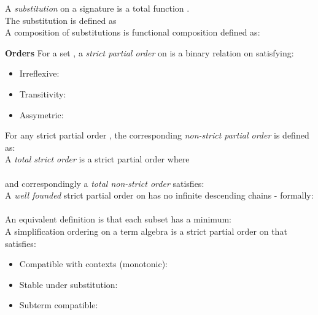 A \emph{substitution} on a signature  is a total function .\\
The substitution \m{[x \mapsto t]} is defined as \\
A composition of substitutions  is functional composition defined as:\\

\textbf{Orders}
For a set , a \emph{strict partial order}  on  is a binary relation on  satisfying:
\begin{itemize}
	\item Irreflexive: 
	\item Transitivity: 
	\item Assymetric: 
\end{itemize}
For any strict partial order \m{\succ}, the corresponding \emph{non-strict partial order} \m{\succeq} is defined as:\\
A \emph{total strict order} is a strict partial order where \\
 \\
and correspondingly a \emph{total non-strict order} satisfies:\\
A \emph{well founded} strict partial order \m{\succ} on  has no infinite descending chains - formally:\\
 \\
An equivalent definition is that each subset has a minimum:\\
A simplification ordering \m{\succ} on a term algebra \Ts{\sig} is a strict partial order on \Ts{\sig} that satisfies:
\begin{itemize}
	\item Compatible with contexts (monotonic):\\
	\item Stable under substitution: 
	\item Subterm compatible: \m{\rhd \subseteq \succ}
\end{itemize}
